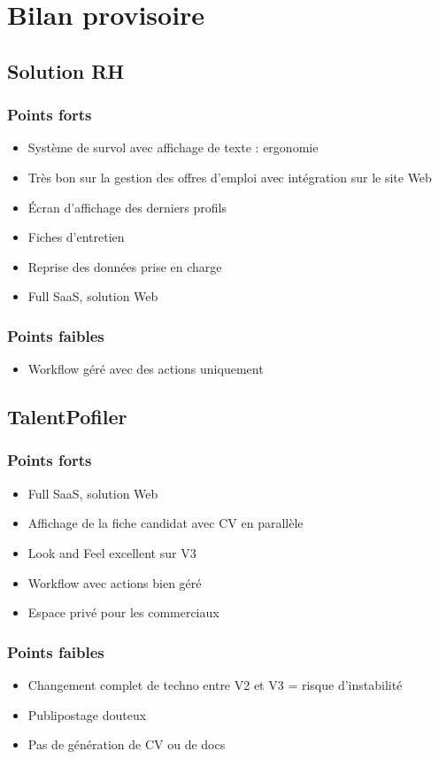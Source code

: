 \documentclass[12pt,twoside]{scrreprt}
\begin{document}
\chapter{Bilan provisoire}
\section{Solution RH}

\subsection{Points forts}
\begin{itemize}
	\item Système de survol avec affichage de texte : ergonomie
	\item Très bon sur la gestion des offres d'emploi avec intégration sur le site Web
	\item Écran d'affichage des derniers profils
	\item Fiches d'entretien
	\item Reprise des données prise en charge
	\item Full SaaS, solution Web
\end{itemize}
\subsection{Points faibles}
\begin{itemize}
	\item Workflow géré avec des actions uniquement
\end{itemize}


\section{TalentPofiler}

\subsection{Points forts}
\begin{itemize}
	\item Full SaaS, solution Web
	\item Affichage de la fiche candidat avec CV en parallèle
	\item Look and Feel excellent sur V3
	\item Workflow avec actions bien géré
	\item Espace privé pour les commerciaux
\end{itemize}
\subsection{Points faibles}
\begin{itemize}
	\item Changement complet de techno entre V2 et V3 = risque d'instabilité
	\item Publipostage douteux
	\item Pas de génération de CV ou de docs
\end{itemize}
\end{document}
